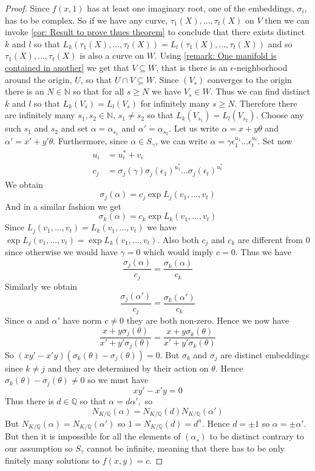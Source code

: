 \documentclass{article}
\newcommand{\mbb}[1]{\mathbb{#1}}
\numberwithin{equation}{section}
\begin{document}
\begin{proof}
	Since $f(x,1)$ has at least one imaginary root, one of the embeddings, $\sigma_i$, has to be complex. So if we have any curve, $\tau_1(X), ..., \tau_t(X)$ on $V$ then we can invoke \cref{cor: Result to prove thues theorem} to conclude that there exists distinct $k$ and $l$ so that $L_{k}(\tau_1(X), ..., \tau_t(X))= L_{l}(\tau_1(X), ..., \tau_t(X))$ and so $\tau_1(X), ..., \tau_t(X)$ is also a curve on $W$. Using \cref{remark: One manifold is contained in another} we get that $V \subseteq W$, that is there is an $\epsilon$-neighborhood around the origin, $U$, so that $U \cap V \subseteq W$. Since $(V_s)$ converges to the origin there is an $N \in \mbb N$ so that for all $s \geq N$ we have $V_s \in W$. Thus we can find distinct $k$ and $l$ so that $L_k(V_s) = L_l(V_s)$ for infinitely many $s \geq N$. Therefore there are infinitely many $s_1, s_2 \in \mbb N$, $s_1 \neq s_2$ so that $L_k(V_{s_1}) = L_l(V_{s_2})$. Choose any such $s_1$ and $s_2$ and set $\alpha = \alpha_{s_1}$ and $\alpha' = \alpha_{s_2}$. Let us write $\alpha = x + y \theta$ and $\alpha' = x' + y'\theta$. Furthermore, since $\alpha \in S_\gamma$, we can write $\alpha = \gamma \epsilon_1^{u_1}...\epsilon_t^{u_t}$. Set now
	\begin{align*}
    	u_i & = u_i^* + v_i                                                             	\\
    	c_j & = \sigma_j(\gamma)\sigma_j(\epsilon_1)^{u_1^*}...\sigma_j(\epsilon_t)^{u_t^*}
	\end{align*}
	We obtain
	$$\sigma_j(\alpha) = c_j \exp L_j(v_1, ..., v_t)$$
	And in a similar fashion we get
	$$\sigma_k(\alpha) = c_k \exp L_k(v_1, ..., v_t)$$
	Since $L_j(v_1, ..., v_t) = L_k(v_1, ..., v_t)$ we have $\exp L_j(v_1, ..., v_t) = \exp L_k(v_1, ..., v_t)$. Also both $c_j$ and $c_k$ are different from 0 since otherwise we would have $\gamma = 0$ which would imply $c = 0$. Thus we have
	$$\frac{\sigma_j(\alpha)}{c_j} = \frac{\sigma_k(\alpha)}{c_k}$$
	Similarly we obtain
	$$\frac{\sigma_j(\alpha')}{c_j} = \frac{\sigma_k(\alpha')}{c_k}$$
	Since $\alpha$ and $\alpha'$ have norm $c \neq 0$ they are both non-zero. Hence we now have
	$$\frac{x + y \sigma_j(\theta)}{x' + y' \sigma_j(\theta)} = \frac{x + y \sigma_k(\theta)}{x' + y' \sigma_k(\theta)}$$
	So
	$(xy' - x'y)(\sigma_k(\theta) - \sigma_j(\theta)) = 0$.
	But $\sigma_k$ and $\sigma_j$ are distinct embeddings since $k \neq j$ and they are determined by their action on $\theta$. Hence $\sigma_k(\theta) - \sigma_j(\theta) \neq 0$ so we must have
	$$xy' - x'y = 0$$
	Thus there is $d \in \mbb Q$ so that
	$\alpha = d\alpha',$ so $$N_{K/\mbb Q}(\alpha) = N_{K/\mbb Q}(d) N_{K/\mbb Q}(\alpha')$$
	But $N_{K/\mbb Q}(\alpha) = N_{K/\mbb Q}(\alpha')$ so $1 = N_{K/\mbb Q}(d) = d^n$. Hence $d = \pm 1$ so $\alpha = \pm \alpha'$. But then it is impossible for all the elements of $(\alpha_s)$ to be distinct contrary to our assumption so $S_\gamma$ cannot be infinite, meaning that there has to be only finitely many solutions to $f(x, y) = c$.
\end{proof}
\end{document}
